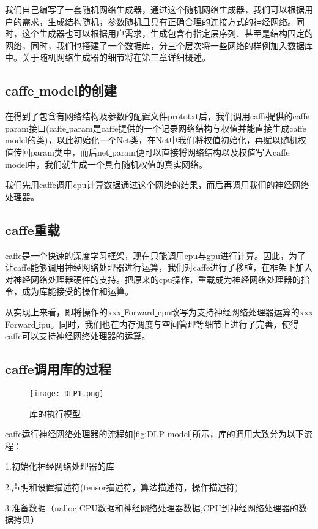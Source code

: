 我们自己编写了一套随机网络生成器，通过这个随机网络生成器，我们可以根据用户的需求，生成结构随机，参数随机且具有正确合理的连接方式的神经网络。同时，这个生成器也可以根据用户需求，生成包含有指定层序列、甚至是结构固定的网络，同时，我们也搭建了一个数据库，分三个层次将一些网络的样例加入数据库中。关于随机网络生成器的细节将在第三章详细概述。

\subsection{caffe\underline{ }model的创建}
在得到了包含有网络结构及参数的配置文件prototxt后，我们调用caffe提供的caffe\underline{ }param接口(caffe\underline{ }param是caffe提供的一个记录网络结构与权值并能直接生成caffe\underline{ }model的类)，以此初始化一个Net类，在Net中我们将权值初始化，再赋以随机权值传回param类中，而后net\underline{ }param便可以直接将网络结构以及权值写入caffe\underline{ }model中，我们就生成一个具有随机权值的真实网络。

我们先用caffe调用cpu计算数据通过这个网络的结果，而后再调用我们的神经网络处理器。

\subsection{caffe重载}
caffe是一个快速的深度学习框架，现在只能调用cpu与gpu进行计算。因此，为了让caffe能够调用神经网络处理器进行运算，我们对caffe进行了移植，在框架下加入对神经网络处理器硬件的支持。把原来的cpu操作，重载成为神经网络处理器的指令，成为库能接受的操作和运算。

从实现上来看，即将操作的xxx\underline{ }Forward\underline{ }cpu改写为支持神经网络处理器运算的xxx\underline{ }Forward\underline{ }ipu。同时，我们也在内存调度与空间管理等细节上进行了完善，使得caffe可以支持神经网络处理器的运算。

\subsection{caffe调用库的过程}
\begin{figure}[!htbp]
\centering
\texttt{[image: DLP1.png]}
\caption{库的执行模型}
\label{fig:DLP model}
\end{figure}
caffe运行神经网络处理器的流程如\autoref{fig:DLP model}所示，库的调用大致分为以下流程：

1.初始化神经网络处理器的库

2.声明和设置描述符(tensor描述符，算法描述符，操作描述符)

3.准备数据（nalloc CPU数据和神经网络处理器数据,CPU到神经网络处理器的数据拷贝）

